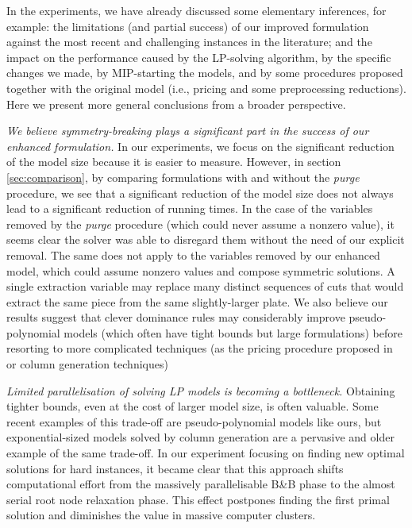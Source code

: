 \documentclass[smallextended]{svjour3}       %
\begin{document}
In the experiments, we have already discussed some elementary inferences, for example: the limitations (and partial success) of our improved formulation against the most recent and challenging instances in the literature; and the impact on the performance caused by the LP-solving algorithm, by the specific changes we made, by MIP-starting the models, and by some procedures proposed together with the original model (i.e., pricing and some preprocessing reductions).
Here we present more general conclusions from a broader perspective.

\emph{We believe symmetry-breaking plays a significant part in the success of our enhanced formulation.}
In our experiments, we focus on the significant reduction of the model size because it is easier to measure.
However, in section \autoref{sec:comparison}, by comparing formulations with and without the \emph{purge} procedure, we see that a significant reduction of the model size does not always lead to a significant reduction of running times.
In the case of the variables removed by the \emph{purge} procedure (which could never assume a nonzero value), it seems clear the solver was able to disregard them without the need of our explicit removal.
The same does not apply to the variables removed by our enhanced model, which could assume nonzero values and compose symmetric solutions.
A single extraction variable may replace many distinct sequences of cuts that would extract the same piece from the same slightly-larger plate.
We also believe our results suggest that clever dominance rules may considerably improve pseudo-polynomial models (which often have tight bounds but large formulations) before resorting to more complicated techniques (as the pricing procedure proposed in~\cite{furini:2016} or column generation techniques)

\emph{Limited parallelisation of solving LP models is becoming a bottleneck.}
Obtaining tighter bounds, even at the cost of larger model size, is often valuable.
Some recent examples of this trade-off are pseudo-polynomial models like ours, but exponential-sized models solved by column generation are a pervasive and older example of the same trade-off.
In our experiment focusing on finding new optimal solutions for hard instances, it became clear that this approach shifts computational effort from the massively parallelisable B\&B phase to the almost serial root node relaxation phase.
This effect postpones finding the first primal solution and diminishes the value in massive computer clusters.
\end{document}

